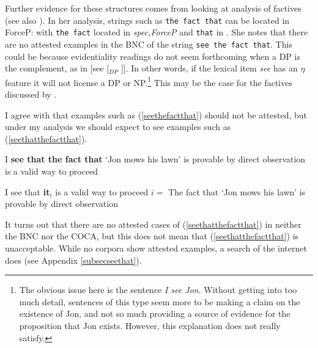 \documentclass[11pt]{article}
\begin{document}
Further evidence for these structures comes from looking at  analysis of factives (see also \cite{simons07obs}). In her analysis, strings such as \texttt{the fact that} can be located in ForceP: with \texttt{the fact} located in \textsl{spec,ForceP} and \texttt{that} in . She notes that there are no attested examples in the BNC of the string \texttt{see the fact that}. This could be because evidentiality readings do not seem forthcoming when a DP is the complement, as in [see [$_{DP}$ ]]. In other words, if the lexical item {\sl see} has an $\eta$ feature it will not license a DP or NP.\footnote{The obvious issue here is the sentence \textsl{I see Jon}. Without getting into too much detail, sentences of this type seem more to be making a claim on the existence of Jon, and not so much providing a source of evidence for the proposition that Jon exists. However, this explanation does not really satisfy.} This may be the case for the factives discussed by \cite{vangelderen05cpsplit}.

I agree with \cite{vangelderen05cpsplit} that examples such as (\ref{seethefactthat}) should not be attested, but under my analysis we should expect to see examples such as (\ref{seethatthefactthat}). 

\begin{exe}
\label{seethefactthat}
\ex I {\bf see that the fact that} `Jon mows his lawn' is provable by direct observation is a valid way to proceed\label{seethatthefactthat}
\begin{xlist}
\ex I see that {\bf it$_{i}$} is a valid way to proceed
\ex $i =$ The fact that `Jon mows his lawn' is provable by direct observation 
\end{xlist}
\end{exe} 
 
It turns out that there are no attested cases of (\ref{seethatthefactthat}) in neither the BNC
nor the COCA, but this does not mean that (\ref{seethatthefactthat}) is unacceptable. While no
corpora show attested examples, a search of the internet does (see Appendix \ref{subsecseethat}).
\end{document}
